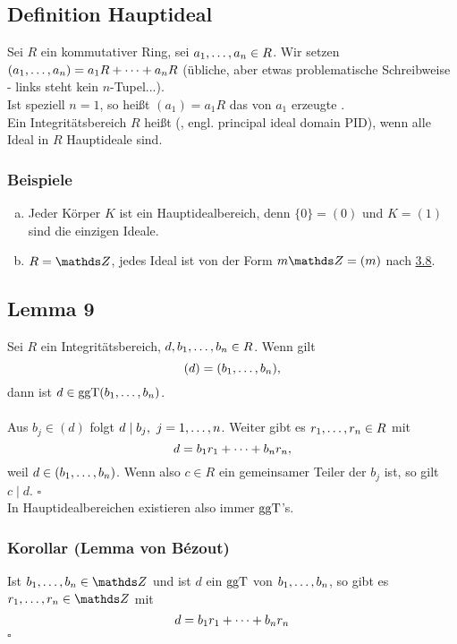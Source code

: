 \subsection{Definition Hauptideal}
\label{sub:def_hauptideal}
Sei $R$ ein kommutativer Ring, sei $a_1, \dots ,a_n\in R$.
Wir setzen $(a_1, \dots ,a_n)=a_1R+ \dots +a_nR$ (übliche, aber etwas problematische Schreibweise - links steht kein $n$-Tupel...).\\
Ist speziell $n=1$, so heißt $(a_1)=a_1R$ das von $a_1$ erzeugte .\\
Ein Integritätsbereich $R$ heißt  (, engl. principal ideal domain PID), wenn alle Ideal in $R$  Hauptideale sind.

\subsubsection*{Beispiele}
\begin{enumerate}[(a)]
	\item Jeder Körper $K$ ist ein Hauptidealbereich, denn $\{0\}=(0)$ und $K=(1)$ sind die einzigen Ideale.
	\item $R=\Z$, jedes Ideal ist von der Form $m\Z=(m)$ nach \hyperref[sub:satz_12]{3.8}.
\end{enumerate}

\subsection{Lemma 9}
\label{sub:lemma_9}
Sei $R$ ein Integritätsbereich, $d,b_1, \dots ,b_n\in R$.
Wenn gilt
\[
(d)=(b_1, \dots ,b_n),
\]
dann ist $d\in\operatorname{ggT}(b_1, \dots ,b_n)$.\\

\\
Aus $b_j\in(d)$ folgt $d\mid b_j,~j=1, \dots ,n$.
Weiter gibt es $r_1, \dots ,r_n\in R$ mit 
\[
d=b_1r_1+ \dots +b_nr_n,
\]
weil $d\in (b_1, \dots ,b_n)$.
Wenn also $c\in R$ ein gemeinsamer Teiler der $b_j$ ist, so gilt $c\mid d$.
\hfill $\square$\\
In Hauptidealbereichen existieren also immer $\operatorname{ggT}$'s.

\subsubsection*{Korollar (Lemma von Bézout)}
Ist $b_1\dt{,}b_n\in \Z$ und ist $d$ ein $\operatorname{ggT}$ von $b_1, \dots ,b_n$, so gibt es $r_1\dt{,}r_n\in \Z$ mit
\[
d=b_1r_1+ \dots +b_nr_n
\]
\hfill $\square$

